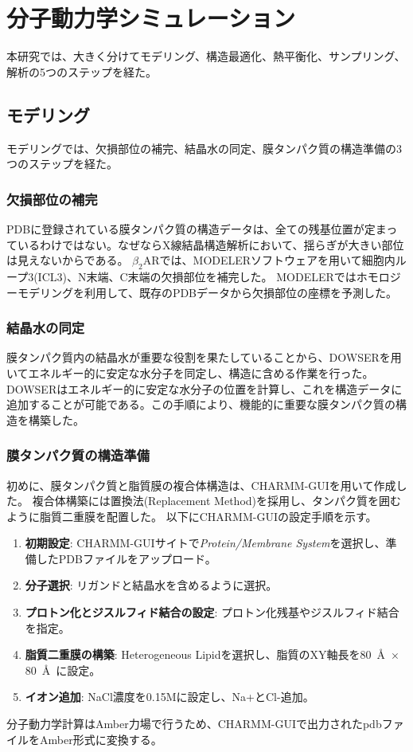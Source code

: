 \section{分子動力学シミュレーション}
\label{sec:md}
本研究では、大きく分けてモデリング、構造最適化、熱平衡化、サンプリング、解析の5つのステップを経た。

\subsection{モデリング}
モデリングでは、欠損部位の補完、結晶水の同定、膜タンパク質の構造準備の3つのステップを経た。

\subsubsection{欠損部位の補完}
PDBに登録されている膜タンパク質の構造データは、全ての残基位置が定まっているわけではない。なぜならX線結晶構造解析において、揺らぎが大きい部位は見えないからである。
$\beta_2$ARでは、MODELERソフトウェアを用いて細胞内ループ3(ICL3)、N末端、C末端の欠損部位を補完した。
MODELERではホモロジーモデリングを利用して、既存のPDBデータから欠損部位の座標を予測した。

\subsubsection{結晶水の同定}

膜タンパク質内の結晶水が重要な役割を果たしていることから、DOWSERを用いてエネルギー的に安定な水分子を同定し、構造に含める作業を行った。
DOWSERはエネルギー的に安定な水分子の位置を計算し、これを構造データに追加することが可能である。この手順により、機能的に重要な膜タンパク質の構造を構築した。

\subsubsection{膜タンパク質の構造準備}
初めに、膜タンパク質と脂質膜の複合体構造は、CHARMM-GUIを用いて作成した。
複合体構築には置換法(Replacement Method)を採用し、タンパク質を囲むように脂質二重膜を配置した。
以下にCHARMM-GUIの設定手順を示す。
\begin{enumerate}
    \item \textbf{初期設定}: CHARMM-GUIサイトで\textit{Protein/Membrane System}を選択し、準備したPDBファイルをアップロード。
    \item \textbf{分子選択}: リガンドと結晶水を含めるように選択。
    \item \textbf{プロトン化とジスルフィド結合の設定}: プロトン化残基やジスルフィド結合を指定。
    \item \textbf{脂質二重膜の構築}: Heterogeneous Lipidを選択し、脂質のXY軸長を80~\AA\ $\times$ 80~\AA\ に設定。
    \item \textbf{イオン追加}: NaCl濃度を0.15Mに設定し、Na+とCl-追加。
\end{enumerate}
分子動力学計算はAmber力場で行うため、CHARMM-GUIで出力されたpdbファイルをAmber形式に変換する。


